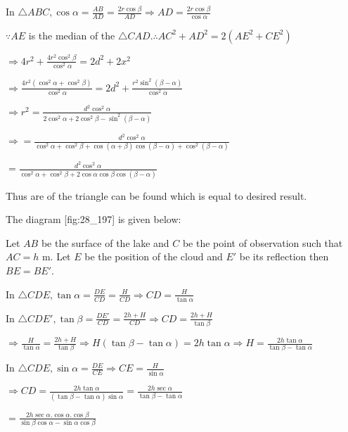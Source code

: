   In $\triangle ABC, \cos\alpha = \frac{AB}{AD} = \frac{2r\cos\beta}{AD}\Rightarrow AD =
  \frac{2r\cos\beta}{\cos\alpha}$

  $\because AE$ is the median of the $\triangle CAD. \therefore AC^2 + AD^2 = 2(AE^2 + CE^2)$

  $\Rightarrow 4r^2 + \frac{4r^2\cos^2\beta}{\cos^2\alpha} = 2d^2 + 2x^2$

  $\Rightarrow \frac{4r^2(\cos^2\alpha + \cos^2\beta)}{\cos^2\alpha} = 2d^2 + \frac{r^2\sin^2(\beta
    - \alpha)}{\cos^2\alpha}$

  $\Rightarrow r^2 = \frac{d^2\cos^2\alpha}{2\cos^2\alpha + 2\cos^2\beta - \sin^2(\beta - \alpha)}$

  $\Rightarrow = \frac{d^2\cos^2\alpha}{\cos^2\alpha + \cos^2\beta + \cos(\alpha + \beta)\cos(\beta
    - \alpha) + \cos^2(\beta - \alpha)}$

  $= \frac{d^2\cos^2\alpha}{\cos^2\alpha + \cos^2\beta + 2\cos\alpha\cos\beta\cos(\beta - \alpha)}$

  Thus are of the triangle can be found which is equal to desired result.

\item The diagram [fig:28_197] is given below:

  \startplacefigure[reference=fig:28_197]
    \externalfigure[28_197.pdf]
  \stopplacefigure

  Let $AB$ be the surface of the lake and $C$ be the point of observation such that $AC
  = h$ m. Let $E$ be the position of the cloud and $E'$ be its reflection then $BE =
  BE'$.

  In $\triangle CDE, \tan\alpha = \frac{DE}{CD} = \frac{H}{CD} \Rightarrow CD =
  \frac{H}{\tan\alpha}$

  In $\triangle CDE', \tan\beta = \frac{DE'}{CD} = \frac{2h + H}{CD} \Rightarrow CD = \frac{2h +
    H}{\tan\beta}$

  $\Rightarrow \frac{H}{\tan\alpha} = \frac{2h + H}{\tan\beta} \Rightarrow H(\tan\beta -
  \tan\alpha) = 2h\tan\alpha \Rightarrow H = \frac{2h\tan\alpha}{\tan\beta - \tan\alpha}$

  In $\triangle CDE, \sin\alpha = \frac{DE}{CE} \Rightarrow CE = \frac{H}{\sin\alpha}$

  $\Rightarrow CD = \frac{2h\tan\alpha}{(\tan\beta - \tan\alpha)\sin\alpha} =
  \frac{2h\sec\alpha}{\tan\beta - \tan\alpha}$

  $= \frac{2h\sec\alpha.\cos\alpha.\cos\beta}{\sin\beta\cos\alpha - \sin\alpha\cos\beta}$

